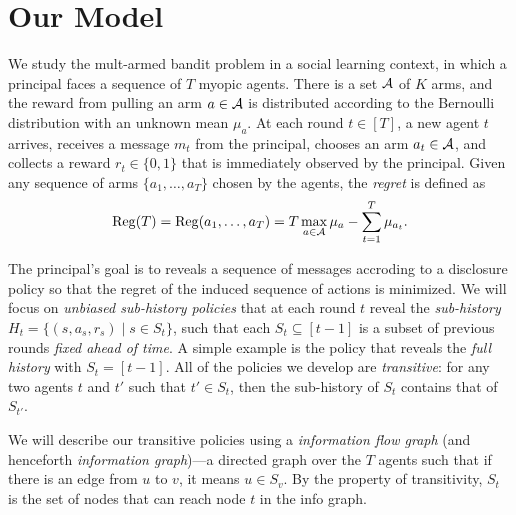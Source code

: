 \section{Our Model}
\label{sec:model}

We study the mult-armed bandit problem in a social learning context,
in which a principal faces a sequence of $T$ myopic agents. There is a
set $\mathcal{A}$ of $K$ arms, and the reward from pulling an arm $a\in \mathcal{A}$ is
distributed according to the Bernoulli distribution with an unknown
mean $\mu_a$. At each round $t\in [T]$, a new agent $t$ arrives,
receives a message $m_t$ from the principal, chooses an arm
$a_t\in \mathcal{A}$, and collects a reward $r_t\in \{0,1\}$ that is
immediately observed by the principal. Given any sequence of arms
$\{a_1, \ldots, a_T\}$ chosen by the agents, the \emph{regret} is
defined as
\[
  \mathrm{Reg}(T)= \mathrm{Reg}(a_1, \ldots , a_T) = T \max_{a\in \mathcal{A}} \mu_a -
  \sum_{t=1}^T \mu_{a_t}.
\]





 The principal's goal is to reveals
a sequence of messages accroding to a disclosure policy so that the
regret of the induced sequence of actions is minimized. We will focus
on \emph{unbiased sub-history policies} that at each round $t$ reveal
the \emph{sub-history} $H_t = \{(s, a_s, r_s)\mid s \in S_t\}$, such
that each $S_t\subseteq [t-1]$ is a subset of previous rounds
\emph{fixed ahead of time}. A simple example is the policy that
reveals the \emph{full history} with $S_t = [t-1]$.  All of the
policies we develop are \emph{transitive}: for any two agents $t$ and
$t'$ such that $t'\in S_t$, then the sub-history of $S_t$ contains
that of $S_{t'}$.


 We will describe our transitive
policies using a \emph{information flow graph} (and henceforth
\emph{information graph})---a directed graph over the $T$ agents such that if
there is an edge from $u$ to $v$, it means $u\in S_v$. By the property
of transitivity, $S_t$ is the set of nodes that can reach node $t$ in
the info graph.

\iffalse
\begin{itemize}
\item \textbf{Full history:} We show each agent the history of all previous agents' pulls. We call this policy \ALGG. 
\item \textbf{Unbiased sub-history:} We show each agent only a subset of history. The subsets are pre-determined before any arms are pulled.  
\item \textbf{Info graph:} All the recommendation policies in this paper can be described by an undirected transitive graph with $T$ nodes. We call it the info graph. The $T$ nodes in the graph represent the $T$ agents. If there is an edge between node $u$ and $v$ for $u < v$, it means the history of agent $u$ is shown to agent $v$.
\end{itemize}
\fi

